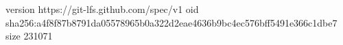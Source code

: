 version https://git-lfs.github.com/spec/v1
oid sha256:a4f8f87b8791da05578965b0a322d2eae4636b9bc4ec576bff5491e366c1dbe7
size 231071
